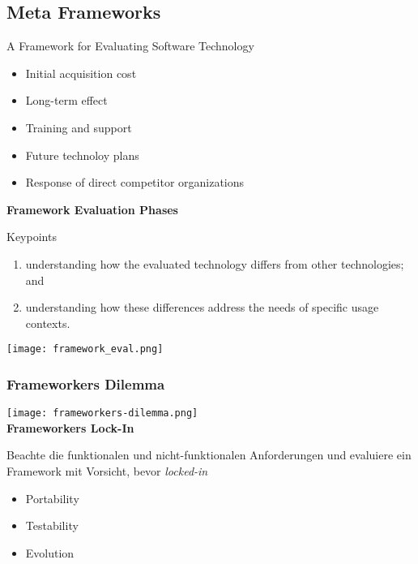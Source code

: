 \subsection{Meta Frameworks}
A Framework for Evaluating Software Technology
\begin{itemize}
    \item Initial acquisition cost
    \item Long-term effect
    \item Training and support
    \item Future technoloy plans
    \item Response of direct competitor organizations
\end{itemize}
\vspace{10pt}
\textbf{Framework Evaluation Phases}

Keypoints

\begin{enumerate}
    \item understanding how the evaluated technology differs from other technologies; and
    \item understanding how these differences address the needs of specific usage contexts.
\end{enumerate}

\texttt{[image: framework\_eval.png]}

\subsubsection{Frameworkers Dilemma}

\texttt{[image: frameworkers-dilemma.png]} \\

\textbf{Frameworkers Lock-In}

Beachte die funktionalen und nicht-funktionalen Anforderungen und evaluiere ein Framework mit Vorsicht, bevor \textit{locked-in}

\begin{itemize}
    \item Portability
    \item Testability
    \item Evolution
\end{itemize}
\vspace{10pt}

\vfill\null
\columnbreak

